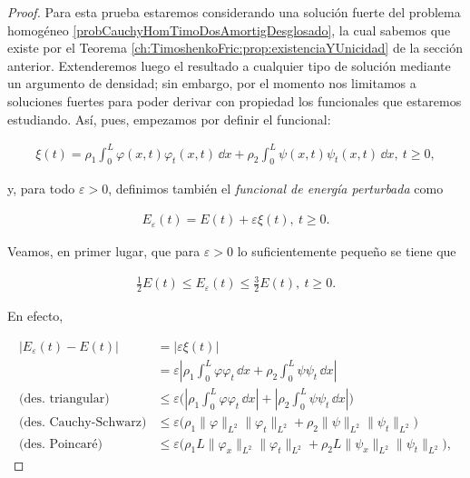\begin{proof}
    Para esta prueba estaremos considerando una solución fuerte del problema homogéneo \eqref{probCauchyHomTimoDosAmortigDesglosado}, la cual sabemos que existe por el Teorema \eqref{ch:TimoshenkoFric:prop:existenciaYUnicidad} de la sección anterior. Extenderemos luego el resultado a cualquier tipo de solución mediante un argumento de densidad; sin embargo, por el momento nos limitamos a soluciones fuertes para poder derivar con propiedad los funcionales que estaremos estudiando. Así, pues, empezamos por definir el funcional:

    \begin{align}
    \label{funcionalAuxiliarXi}
        \xi(t) = \rho_1\int_0^L \varphi(x,t) \varphi_t(x,t) \, \dd x + \rho_2 \int_0^L \psi(x,t) \psi_t(x,t) \, \dd x, \ t \geq 0,
    \end{align}

    y, para todo $\varepsilon > 0$, definimos también el \textit{funcional de energía perturbada} como

    \begin{align}
        \label{dosDisip:energiaPerturbada}
        E_{\varepsilon}(t) = E(t) + \varepsilon\xi(t), \ t \geq 0.
    \end{align}

    Veamos, en primer lugar, que para $\varepsilon > 0$ lo suficientemente pequeño se tiene que

    \begin{align}
        \label{afirmacion1}
        \frac{1}{2}E(t) \leq E_\varepsilon(t) \leq \frac{3}{2}E(t), \ t \geq 0.
    \end{align}

    En efecto,

    \begin{align*}
        \lvert E_\varepsilon(t) - E(t)\lvert &= \lvert \varepsilon \xi(t) \lvert\\
        &=\varepsilon\left\lvert \rho_1\int_0^L \varphi\varphi_t \, \dd x + \rho_2 \int_0^L \psi\psi_t \, \dd x \right\lvert\\
        \text{(des. triangular)}&\leq \varepsilon\Bigg(\left\lvert \rho_1\int_0^L \varphi\varphi_t \, \dd x\right\lvert + \left\lvert\rho_2 \int_0^L \psi\psi_t \, \dd x \right\lvert\Bigg)\\
        \text{(des. Cauchy-Schwarz)}&\leq \varepsilon\Bigg( \rho_1 \lVert \varphi \rVert_{L^2} \lVert \varphi_t \rVert_{L^2} + \rho_2 \lVert\psi\rVert_{L^2} \lVert\psi_t\rVert_{L^2} \Bigg)\\
        \text{(des. Poincaré)}&\leq \varepsilon\Bigg( \rho_1L \lVert \varphi_x \rVert_{L^2} \lVert \varphi_t \rVert_{L^2} + \rho_2L\lVert\psi_x\rVert_{L^2} \lVert\psi_t\rVert_{L^2} \Bigg),
    \end{align*}


\end{proof}
